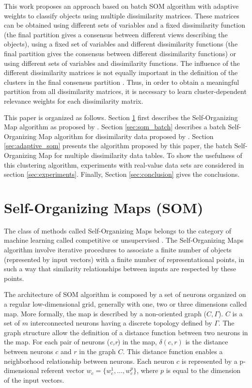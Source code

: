 \documentclass[10pt, conference, compsocconf]{IEEEtran}
\begin{document}
This work proposes an approach based on batch SOM algorithm with adaptive weights to classify objects using multiple dissimilarity matrices. These matrices can be obtained using different sets of variables and a fixed dissimilarity function (the final partition gives a consensus between different views describing the objects), using a fixed set of variables and different dissimilarity functions (the final partition gives the consensus between different dissimilarity functions) or using different sets of variables and dissimilarity functions. The influence of the different dissimilarity matrices is not equally important in the definition of the clusters in the final consensus partition \cite{Frigui:2007}. Thus, in order to obtain a meaningful partition from all dissimilarity matrices, it is necessary to learn cluster-dependent relevance weights for each dissimilarity matrix.

This paper is organized as follows. Section \ref{sec:som} first describes the Self-Organizing Map algorithm as proposed by \cite{Kohonen:1990}. Section \ref{sec:som_batch} describes a batch Self-Organizing Map algorithm for dissimilarity data proposed by \cite{golli:2004}. Section \ref{sec:adaptive_som} presents the algorithm proposed by this paper, the batch Self-Organizing Map for multiple dissimilarity data tables. To show the usefulness of this clustering algorithm, experiments with real-value data sets are considered in section \ref{sec:experiments}. Finally, Section \ref{sec:conclusion} gives the conclusions.

\section{Self-Organizing Maps (SOM)}\label{sec:som}

The class of methods called Self-Organizing Maps \cite{Kohonen:1990} belongs to the category of machine learning called competitive or unsupervised \cite{Murtagh:1995}. The Self-Organizing Maps algorithm involve iterative procedures to associate a finite number of objects (represented by input vectors) with a finite number of representational points, in such a way that similarity relationships between inputs are respected by these points.

The architecture of SOM algorithm is composed by a set of neurons organized on a regular low-dimensional grid, generally with one, two or three dimensions called map. More formally, the map is described by a non-oriented graph ($C,\Gamma$). $C$ is a set of $m$ interconnected neurons having a discrete topology defined by $\Gamma$. The graph structure allow the definition of a distance function between two neurons in the map. For each pair of neurons (\textit{c,r}) in the map, $\delta(c,r)$ is the distance between neurons $c$ and $r$ in the graph $C$. This distance function enables a neighborhood relationship between neurons. Each neuron $c$ is represented by a p-dimensional referent vector $w_c = \{w_c^1, \dots, w_c^p\}$, where $p$ is equal to the dimension of the input vectors.
\end{document}
